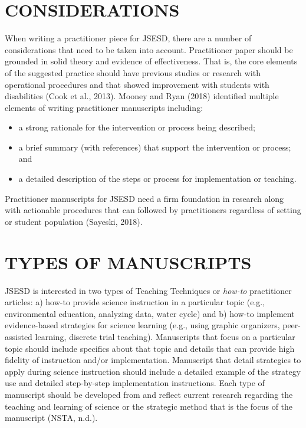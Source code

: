 \documentclass[11.5pt]{sig-alternate} %
\begin{document}
\begin{large}
\section*{CONSIDERATIONS}
When writing a practitioner piece for JSESD, there are a number of considerations that need to be taken into account.  Practitioner paper should be grounded in solid theory and evidence of effectiveness.  That is, the core elements of the suggested practice should have previous studies or research with operational procedures and that showed improvement with students with disabilities (Cook et al., 2013). Mooney and Ryan (2018) identified multiple elements of writing practitioner manuscripts including:
\begin{itemize}
    \item a strong rationale for the intervention or process being described;
    \item a brief summary (with references) that support the intervention or process; and
    \item a detailed description of the steps or process for implementation or teaching.
\end{itemize}

Practitioner manuscripts for JSESD need a firm foundation in research along with actionable procedures that can followed by practitioners regardless of setting or student population (Sayeski, 2018).  

\section*{TYPES OF MANUSCRIPTS}

JSESD is interested in two types of Teaching Techniques or \textit{how-to} practitioner articles: a) how-to provide science instruction in a particular topic (e.g., environmental education, analyzing data, water cycle) and b) how-to implement evidence-based strategies for science learning (e.g., using graphic organizers, peer-assisted learning, discrete trial teaching). Manuscripts that focus on a particular topic should include specifics about that topic and details that can provide high fidelity of instruction and/or implementation.  Manuscript that detail strategies to apply during science instruction should include a detailed example of the strategy use and detailed step-by-step implementation instructions.  Each type of manuscript should be developed from and reflect current research regarding the teaching and learning of science or the strategic method that is the focus of the manuscript (NSTA, n.d.).  


\end{large}
\end{document}
